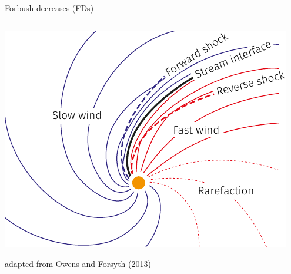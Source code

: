 \documentclass[10pt,aspectratio=169,usenames,dvipsnames]{beamer}
\begin{document}
\begin{frame}{Forbush decreases (FDs)}
\begin{columns}[t]
\begin{column}{0.35\textwidth}
\begin{overprint}
                \includegraphics[width=\textwidth]{images/Owens-Forsyth-adapted.pdf}
                \begin{flushright}
                    \scriptsize adapted from Owens and Forsyth (2013)
                \end{flushright}    
            \end{overprint}
        \end{column}
    \end{columns}
\end{frame}
\end{document}
